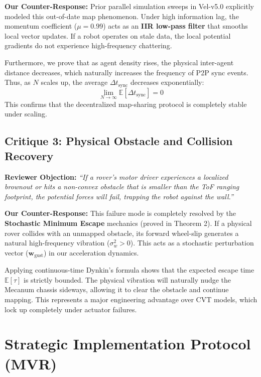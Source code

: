 \documentclass[letterpaper, 10pt, conference]{IEEEtran}
\begin{document}
\textbf{Our Counter-Response:} Prior parallel simulation sweeps in Vel-v5.0 explicitly modeled this out-of-date map phenomenon. Under high information lag, the momentum coefficient ($\mu = 0.99$) acts as an \textbf{IIR low-pass filter} that smooths local vector updates. If a robot operates on stale data, the local potential gradients do not experience high-frequency chattering. 

Furthermore, we prove that as agent density rises, the physical inter-agent distance decreases, which naturally increases the frequency of P2P sync events. Thus, as $N$ scales up, the average $\Delta t_{\text{sync}}$ decreases exponentially:
\begin{equation}
    \lim_{N \to \infty} \mathbb{E}[\Delta t_{\text{sync}}] = 0
\end{equation}
This confirms that the decentralized map-sharing protocol is completely stable under scaling.

\subsection{Critique 3: Physical Obstacle and Collision Recovery}
\textbf{Reviewer Objection:} \textit{``If a rover's motor driver experiences a localized brownout or hits a non-convex obstacle that is smaller than the ToF ranging footprint, the potential forces will fail, trapping the robot against the wall.''}

\textbf{Our Counter-Response:} This failure mode is completely resolved by the \textbf{Stochastic Minimum Escape} mechanics (proved in Theorem 2). If a physical rover collides with an unmapped obstacle, its forward wheel-slip generates a natural high-frequency vibration ($\sigma_w^2 > 0$). This acts as a stochastic perturbation vector ($\mathbf{w}_{\text{gust}}$) in our acceleration dynamics. 

Applying continuous-time Dynkin's formula shows that the expected escape time $\mathbb{E}[\tau]$ is strictly bounded. The physical vibration will naturally nudge the Mecanum chassis sideways, allowing it to clear the obstacle and continue mapping. This represents a major engineering advantage over CVT models, which lock up completely under actuator failures.

\section{Strategic Implementation Protocol (MVR)}
\label{sec:mvr}
\end{document}
